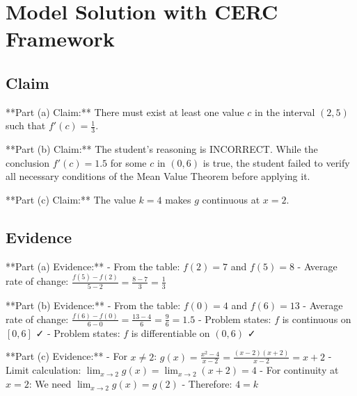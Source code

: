\documentclass[11pt,letterpaper]{article}
\begin{document}
\vspace{0.5cm}


\section*{\textcolor{alphablue}{Model Solution with CERC Framework}}

\subsection*{\textcolor{alphacyan}{Claim}}
\begin{tcolorbox}[colback=alphacyan!5!white, colframe=alphacyan!50, arc=2mm]
  **Part (a) Claim:** There must exist at least one value $c$ in the interval $(2, 5)$ such that $f'(c) = \frac{1}{3}$.

**Part (b) Claim:** The student's reasoning is INCORRECT. While the conclusion $f'(c) = 1.5$ for some $c$ in $(0, 6)$ is true, the student failed to verify all necessary conditions of the Mean Value Theorem before applying it.

**Part (c) Claim:** The value $k = 4$ makes $g$ continuous at $x = 2$.
\end{tcolorbox}

\subsection*{\textcolor{alphacyan}{Evidence}}
\begin{tcolorbox}[colback=alphacyan!5!white, colframe=alphacyan!50, arc=2mm]
  **Part (a) Evidence:**
- From the table: $f(2) = 7$ and $f(5) = 8$
- Average rate of change: $\frac{f(5) - f(2)}{5 - 2} = \frac{8 - 7}{3} = \frac{1}{3}$

**Part (b) Evidence:**
- From the table: $f(0) = 4$ and $f(6) = 13$
- Average rate of change: $\frac{f(6) - f(0)}{6 - 0} = \frac{13 - 4}{6} = \frac{9}{6} = 1.5$
- Problem states: $f$ is continuous on $[0, 6]$ ✓
- Problem states: $f$ is differentiable on $(0, 6)$ ✓

**Part (c) Evidence:**
- For $x \neq 2$: $g(x) = \frac{x^2 - 4}{x - 2} = \frac{(x-2)(x+2)}{x-2} = x + 2$
- Limit calculation: $\lim_{x \to 2} g(x) = \lim_{x \to 2} (x + 2) = 4$
- For continuity at $x = 2$: We need $\lim_{x \to 2} g(x) = g(2)$
- Therefore: $4 = k$
\end{tcolorbox}
\end{document}
